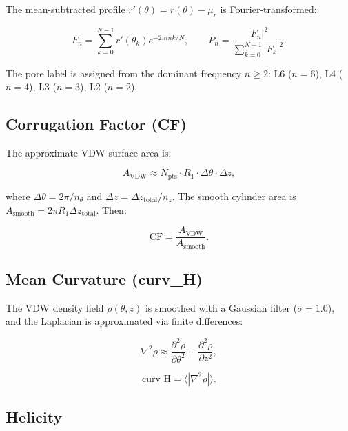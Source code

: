 \documentclass[11pt,a4paper]{article}
\begin{document}
The mean-subtracted profile $r'(\theta) = r(\theta) - \mu_r$ is
Fourier-transformed:

\begin{equation}
F_n = \sum_{k=0}^{N-1} r'(\theta_k) e^{-2\pi i n k / N},
\qquad P_n = \frac{|F_n|^2}{\sum_{k=0}^{N-1} |F_k|^2}.
\end{equation}

The pore label is assigned from the dominant frequency $n \ge 2$:
L6 ($n=6$), L4 ($n=4$), L3 ($n=3$), L2 ($n=2$).

\subsection{Corrugation Factor (CF)}

The approximate VDW surface area is:

\begin{equation}
A_{\text{VDW}} \approx N_{\text{pts}} \cdot R_1 \cdot \Delta\theta \cdot
\Delta z,
\end{equation}

where $\Delta\theta = 2\pi / n_\theta$ and $\Delta z = \Delta z_{\text{total}} / n_z$.
The smooth cylinder area is $A_{\text{smooth}} = 2\pi R_1 \Delta z_{\text{total}}$.
Then:

\begin{equation}
\text{CF} = \frac{A_{\text{VDW}}}{A_{\text{smooth}}}.
\end{equation}

\subsection{Mean Curvature (curv\_H)}

The VDW density field $\rho(\theta, z)$ is smoothed with a Gaussian
filter ($\sigma = 1.0$), and the Laplacian is approximated via finite
differences:

\begin{equation}
\nabla^2 \rho \approx \frac{\partial^2 \rho}{\partial \theta^2} +
\frac{\partial^2 \rho}{\partial z^2},
\end{equation}

\begin{equation}
\text{curv\_H} = \langle |\nabla^2 \rho| \rangle.
\end{equation}

\subsection{Helicity}
\end{document}
